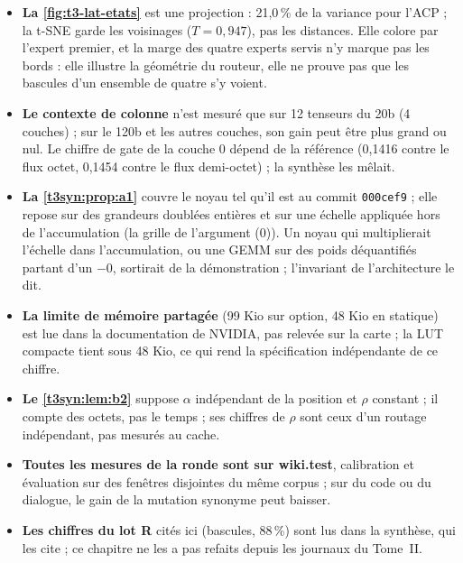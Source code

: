 \begin{faux}
\begin{itemize}
\item \textbf{La \cref{fig:t3-lat-etats}} est une projection : 21,0\,\% de la variance pour l'ACP ; la t-SNE garde les voisinages ($T = 0{,}947$), pas les distances. Elle colore par l'expert premier, et la marge des quatre experts servis n'y marque pas les bords : elle illustre la géométrie du routeur, elle ne prouve pas que les bascules d'un ensemble de quatre s'y voient.
\item \textbf{Le contexte de colonne} n'est mesuré que sur 12 tenseurs du 20b (4 couches) ; sur le 120b et les autres couches, son gain peut être plus grand ou nul. Le chiffre de gate de la couche 0 dépend de la référence (0,1416 contre le flux octet, 0,1454 contre le flux demi-octet) ; la synthèse les mêlait.
\item \textbf{La \cref{t3syn:prop:a1}} couvre le noyau tel qu'il est au commit \texttt{000cef9} ; elle repose sur des grandeurs doublées entières et sur une échelle appliquée hors de l'accumulation (la grille de l'argument (0)). Un noyau qui multiplierait l'échelle dans l'accumulation, ou une GEMM sur des poids déquantifiés partant d'un $-0$, sortirait de la démonstration ; l'invariant de l'architecture le dit.
\item \textbf{La limite de mémoire partagée} (99 Kio sur option, 48 Kio en statique) est lue dans la documentation de NVIDIA, pas relevée sur la carte ; la LUT compacte tient sous 48 Kio, ce qui rend la spécification indépendante de ce chiffre.
\item \textbf{Le \cref{t3syn:lem:b2}} suppose $\alpha$ indépendant de la position et $\rho$ constant ; il compte des octets, pas le temps ; ses chiffres de $\rho$ sont ceux d'un routage indépendant, pas mesurés au cache.
\item \textbf{Toutes les mesures de la ronde sont sur wiki.test}, calibration et évaluation sur des fenêtres disjointes du même corpus ; sur du code ou du dialogue, le gain de la mutation synonyme peut baisser.
\item \textbf{Les chiffres du lot R} cités ici (bascules, 88\,\%) sont lus dans la synthèse, qui les cite ; ce chapitre ne les a pas refaits depuis les journaux du Tome~II.
\end{itemize}
\end{faux}
